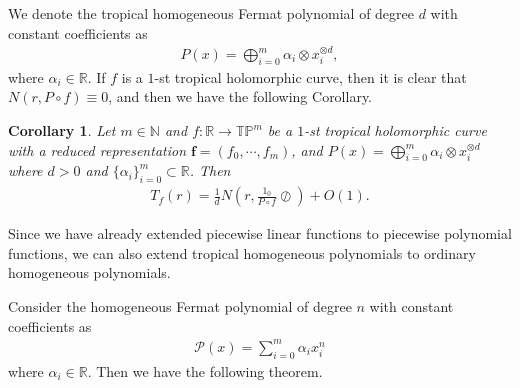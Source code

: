 \documentclass{article}
\newtheorem{corollary}[defin]{Corollary}
\begin{document}
We denote the tropical homogeneous Fermat polynomial of degree $d$ with constant coefficients as
\begin{eqnarray*}
P(x)=\bigoplus\limits_{i=0}^{m}\alpha_{i}\otimes x_{i}^{\otimes d},
\end{eqnarray*}
where $\alpha_{i}\in\mathbb{R}$. If $f$ is a $1$-st tropical holomorphic curve, then it is clear that $N(r, P\circ f)\equiv 0$, and then we have the following Corollary.

\begin{corollary}
Let $m\in\mathbb{N}$ and $f:\mathbb{R}\rightarrow \mathbb{T}\mathbb{P}^{m}$ be a $1$-st tropical holomorphic curve with a reduced representation $\textbf{f}=(f_{0}, \cdots, f_{m})$, and $P(x)=\bigoplus\limits_{i=0}^{m}\alpha_{i}\otimes x_{i}^{\otimes d}$ where $d>0$ and $\{\alpha_{i}\}_{i=0}^{m}\subset \mathbb{R}$. Then
    \begin{eqnarray}
        T_{f}(r)=\frac{1}{d}N\left(r, \frac{1_{0}}{P\circ f}\oslash\right)+O(1).
    \end{eqnarray}
    \end{corollary}

Since we have already extended piecewise linear functions to piecewise polynomial functions, we can also extend tropical homogeneous polynomials to ordinary homogeneous polynomials.

Consider the homogeneous Fermat polynomial of degree $n$ with constant coefficients as
\begin{eqnarray*}
    \mathcal{P}(x)=\sum_{i=0}^{m}\alpha_{i}x_{i}^{n}
\end{eqnarray*}
where $\alpha_{i}\in\mathbb{R}$. Then we have the following theorem.
\end{document}
